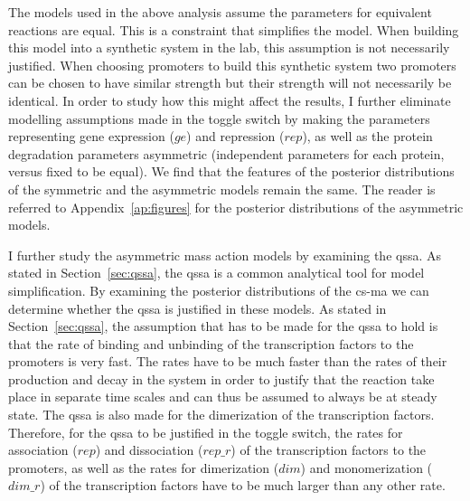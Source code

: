 The models used in the above analysis assume the parameters for equivalent reactions are equal. This is a constraint that simplifies the model. When building this model into a synthetic system in the lab, this assumption is not necessarily justified. When choosing promoters to build this synthetic system two promoters can be chosen to have similar strength but their strength will not necessarily be identical.  In order to study how this might affect the results, I further eliminate modelling assumptions made in the toggle switch by making the parameters representing gene expression ($ge$) and repression ($rep$), as well as the protein degradation parameters asymmetric (independent parameters for each protein, versus fixed to be equal). We find that the features of the posterior distributions of the symmetric and the asymmetric models remain the same. The reader is referred to Appendix~\ref{ap:figures} for the posterior distributions of the asymmetric models. 


I further study the asymmetric mass action models by examining the \acrshort{qssa}. As stated in Section~\ref{sec:qssa}, the \acrshort{qssa} is a common analytical tool for model simplification. By examining the posterior distributions of the \acrshort{cs-ma} we can determine whether the \acrshort{qssa} is justified in these models. As stated in Section~\ref{sec:qssa}, the assumption that has to be made for the \acrshort{qssa} to hold is that the rate of binding and unbinding of the transcription factors to the promoters is very fast. The rates have to be much faster than the rates of their production and decay in the system in order to justify that the reaction take place in separate time scales and can thus be assumed to always be at steady state. The \acrshort{qssa} is also made for the dimerization of the transcription factors. Therefore, for the \acrshort{qssa} to be justified in the toggle switch, the rates for association ($rep$) and dissociation ($rep\_r$) of the transcription factors to the promoters, as well as the rates for dimerization ($dim$) and monomerization ($dim\_r$) of the transcription factors have to be much larger than any other rate.


